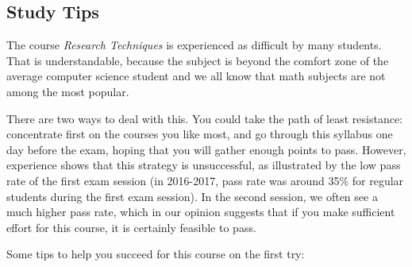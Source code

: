 \subsection{Study Tips}

The course \emph{Research Techniques} is experienced as difficult by many students. That is understandable, because the subject is beyond the comfort zone of the average computer science student and we all know that math subjects are not among the most popular.

There are two ways to deal with this. You could take the path of least resistance: concentrate first on the courses you like most, and go through this syllabus one day before the exam, hoping that you will gather enough points to pass. However, experience shows that this strategy is unsuccessful, as illustrated by the low pass rate of the first exam session (in 2016-2017, pass rate was around 35\% for regular students during the first exam session). In the second session, we often see a much higher pass rate, which in our opinion suggests that if you make sufficient effort for this course, it is certainly feasible to pass.

Some tips to help you succeed for this course on the first try:

